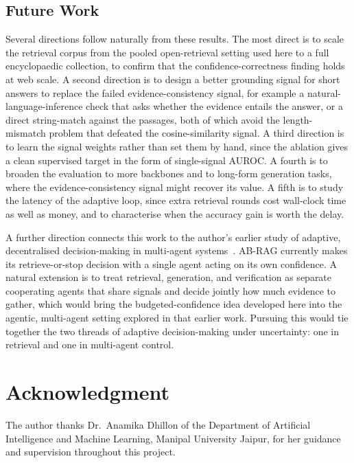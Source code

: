 \documentclass[conference,a4paper,10pt]{IEEEtran}
\begin{document}
\subsection{Future Work}
Several directions follow naturally from these results. The most direct is to scale the
retrieval corpus from the pooled open-retrieval setting used here to a full encyclopaedic
collection, to confirm that the confidence-correctness finding holds at web scale. A second
direction is to design a better grounding signal for short answers to replace the failed
evidence-consistency signal, for example a natural-language-inference check that asks
whether the evidence entails the answer, or a direct string-match against the passages,
both of which avoid the length-mismatch problem that defeated the cosine-similarity signal.
A third direction is to learn the signal weights rather than set them by hand, since the
ablation gives a clean supervised target in the form of single-signal AUROC. A fourth is
to broaden the evaluation to more backbones and to long-form generation tasks, where the
evidence-consistency signal might recover its value. A fifth is to study the latency of
the adaptive loop, since extra retrieval rounds cost wall-clock time as well as money, and
to characterise when the accuracy gain is worth the delay.

A further direction connects this work to the author's earlier study of adaptive,
decentralised decision-making in multi-agent systems~\cite{kamthan2025marl}. AB-RAG
currently makes its retrieve-or-stop decision with a single agent acting on its own
confidence. A natural extension is to treat retrieval, generation, and verification as
separate cooperating agents that share signals and decide jointly how much evidence to
gather, which would bring the budgeted-confidence idea developed here into the agentic,
multi-agent setting explored in that earlier work. Pursuing this would tie together the
two threads of adaptive decision-making under uncertainty: one in retrieval and one in
multi-agent control.

\section*{Acknowledgment}
The author thanks Dr.~Anamika Dhillon of the Department of Artificial Intelligence and
Machine Learning, Manipal University Jaipur, for her guidance and supervision throughout
this project.



\end{document}
